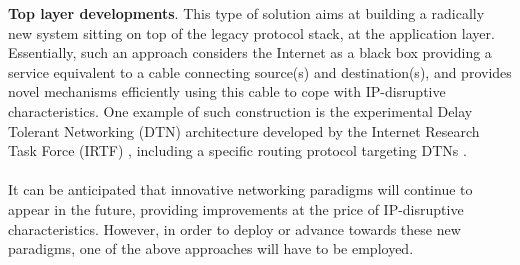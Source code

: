 %
{\bf Top layer developments}. This type of solution aims at building a radically new system sitting on top of the legacy protocol stack, at the application layer. Essentially, such an approach considers the Internet as a black box providing a service equivalent to a cable connecting source(s) and destination(s), and provides novel mechanisms efficiently using this cable to cope with IP-disruptive characteristics. One example of such construction is the experimental Delay Tolerant Networking (DTN) architecture developed by the Internet Research Task Force (IRTF) \cite{DTNRG} \cite{ietf:rfc5050} \cite{ietf:rfc5326}, including a specific routing protocol targeting DTNs \cite{ietf:rfc6693}.\ \\ \ \\
%
%
It can be anticipated that innovative networking paradigms will continue to appear in the future, providing improvements at the price of IP-disruptive characteristics. However, in order to deploy or advance towards these new paradigms, one of the above approaches will have to be employed.






